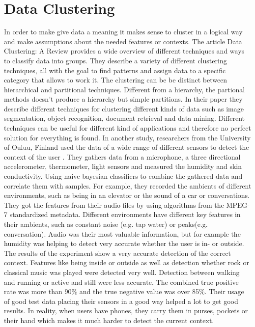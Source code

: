 \section{Data Clustering}
In order to make give data a meaning it makes sense to cluster in a logical way and make assumptions about the needed features or contexts. 
The article Data Clustering: A Review \cite{jain1999data} provides a wide overview of different techniques and ways to classify data into groups. They describe a variety of different clustering techniques, all with the goal to find patterns and assign data to a specific category that allows to work it. The clustering can be be distinct between hierarchical and partitional techniques. Different from a hierarchy, the partional methods doesn't produce a hierarchy but simple partitions. In their paper they describe different techniques for clustering different kinds of data such as image segmentation, object recognition, document retrieval and data mining. Different techniques can be useful for different kind of applications and therefore no perfect solution for everything is found. 
In another study, researchers from the University of Ouluu, Finland used the data of a wide range of different sensors to detect the context of the user \cite{korpipaa2003bayesian}. They gathers data from a microphone, a three directional accelerometer, thermometer, light sensors and measured the humidity and skin conductivity. 
Using naive bayesian classifiers to combine the gathered data and correlate them with samples. For example, they recorded the ambients of different environments, such as being in an elevator or the sound of a car or conversations. They got the features from their audio files by using algorithms from the MPEG-7 standardized metadata. Different environments have different key features in their ambients, such as constant noise (e.g. tap water) or peaks(e.g. conversation).
Audio was their most valuable information, but for example the humidity was helping to detect very accurate whether the user is in- or outside.
The results of the experiment show a very accurate detection of the correct context. Features like being inside or outside as well as detection whether rock or classical music was played were detected very well. Detection between walking and running or active and still were less accurate.
The combined true positive rate was more than 90\% and the true negative value was over 85\%. Their usage of good test data placing their sensors in a good way helped a lot to get good results. In reality, when users have phones, they carry them in purses, pockets or their hand which makes it much harder to detect the current context.


